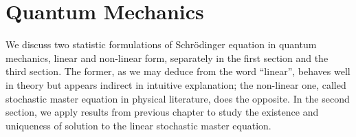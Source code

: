 \chapter{Quantum Mechanics}


We discuss two statistic formulations of Schrödinger equation in quantum mechanics, linear and non-linear form, separately in the first section and the third section.
The former, as we may deduce from the word ``linear'', behaves well in theory but appears indirect in intuitive explanation; the non-linear one, called stochastic master equation in physical literature, does the opposite. In the second section, we apply results from previous chapter to study the existence and uniqueness of solution to the linear stochastic master equation.


